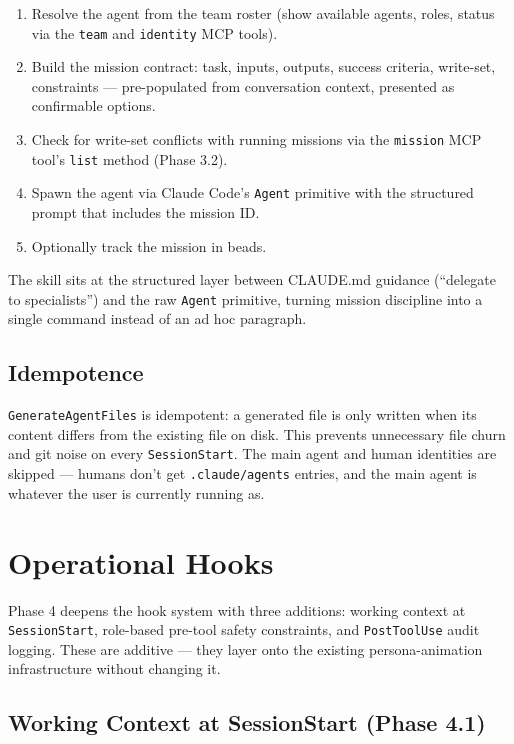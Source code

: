\documentclass[a4paper,10pt]{article}
\newcommand{\tool}[1]{\texttt{#1}}
\newcommand{\fpath}[1]{\texttt{#1}}
\begin{document}
\begin{enumerate}
  \item Resolve the agent from the team roster (show available
    agents, roles, status via the \tool{team} and \tool{identity}
    MCP tools).
  \item Build the mission contract: task, inputs, outputs, success
    criteria, write-set, constraints --- pre-populated from
    conversation context, presented as confirmable options.
  \item Check for write-set conflicts with running missions via the
    \tool{mission} MCP tool's \texttt{list} method (Phase 3.2).
  \item Spawn the agent via Claude Code's \texttt{Agent} primitive
    with the structured prompt that includes the mission ID.
  \item Optionally track the mission in beads.
\end{enumerate}

The skill sits at the structured layer between CLAUDE.md guidance
(``delegate to specialists'') and the raw \texttt{Agent} primitive,
turning mission discipline into a single command instead of an ad
hoc paragraph.

\subsection{Idempotence}

\texttt{GenerateAgentFiles} is idempotent: a generated file is only
written when its content differs from the existing file on disk.
This prevents unnecessary file churn and git noise on every
\texttt{SessionStart}.  The main agent and human identities are
skipped --- humans don't get \fpath{.claude/agents} entries, and
the main agent is whatever the user is currently running as.

\section{Operational Hooks}

Phase 4 deepens the hook system with three additions: working
context at \texttt{SessionStart}, role-based pre-tool safety
constraints, and \texttt{PostToolUse} audit logging.  These are
additive --- they layer onto the existing persona-animation
infrastructure without changing it.

\subsection{Working Context at SessionStart (Phase 4.1)}
\end{document}
